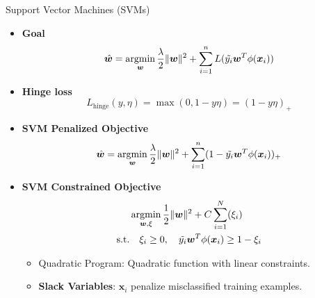 \documentclass[10pt,mathserif]{beamer}
\begin{document}
\begin{frame}{Support Vector Machines (SVMs) }
\begin{itemize}
    \item \textbf{Goal}
    \begin{equation*}
    \hat{\bm{w}} = \mathop{\rm argmin}_{\bm{w}} \frac{\lambda}{2}\|\bm{w}\|^2 + \sum_{i=1}^n L(\tilde{y_i} \bm{w}^T\phi(\bm{x}_i))
    \end{equation*}
    \item \textbf{Hinge loss}
    \begin{equation*}
        L_{\text{hinge}}(y, \eta) = \max(0, 1 - y\eta) = (1 - y\eta)_+
    \end{equation*}
    \item \textbf{SVM Penalized Objective}
    \begin{equation*}
    \hat{\bm{w}} = \mathop{\rm argmin}_{\bm{w}} \frac{\lambda}{2}\|\bm{w}\|^2 + \sum_{i=1}^n (1-\tilde{y_i} \bm{w}^T\phi(\bm{x}_i))_+
    \end{equation*}
    \item \textbf{SVM Constrained Objective}
    \begin{equation*}
        \begin{split}
            & \mathop{\rm argmin}_{\bm{w},\xi} \frac{1}{2}\|\bm{w}\|^2 + C\sum_{i=1}^N (\xi_i)\\
            \text{s.t.} & \quad \xi_i\geq 0, \quad \tilde{y_i} \bm{w}^T\phi(\bm{x}_i)\geq 1-\xi_i
        \end{split}
    \end{equation*}
    \begin{itemize}
    \item Quadratic Program: Quadratic function with linear constraints.
    \item \textbf{Slack Variables}: $\bm{x}_i$ penalize misclassified training examples.
    \end{itemize}
\end{itemize}
\end{frame}
\end{document}
